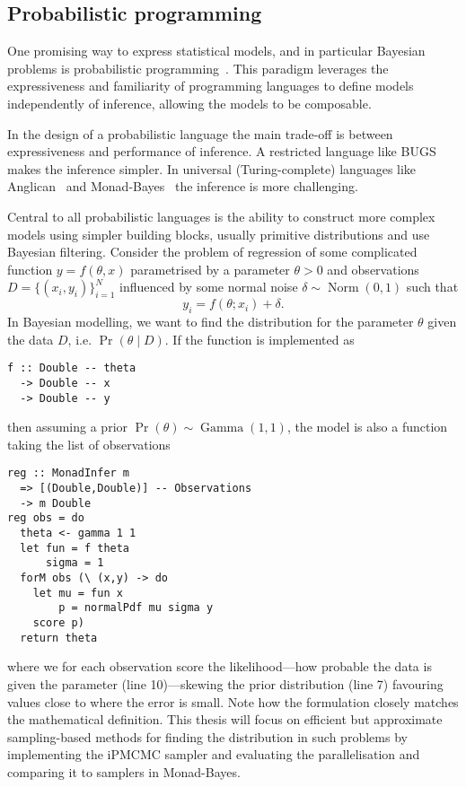 \subsection{Probabilistic programming}
\label{sec:pprog}

One promising way to express statistical models, and in particular Bayesian problems is probabilistic programming~\cite{dippl}. This paradigm leverages the expressiveness and familiarity of programming
languages  to define models independently of inference, allowing the models to be composable.

In the design of a probabilistic language the main trade-off is between
expressiveness and performance of inference. A restricted language like
BUGS~\cite{bugs} makes the inference simpler. In universal
(Turing-complete) languages like Anglican~\cite{anglican} and
Monad-Bayes~\cite{mbayes} the inference is more challenging.

Central to all probabilistic languages is the ability to construct more
complex models using simpler building blocks, usually primitive distributions
and use Bayesian filtering. Consider the problem of regression of some complicated function $y = f(\theta,x)$ parametrised by a parameter $\theta > 0$ and observations $D = \{ (x_i,y_i) \}_{i=1}^N$ influenced by some normal noise $\delta \sim \operatorname{Norm}(0,1)$ such that
\begin{equation}
   y_i = f(\theta;x_i) + \delta .
\end{equation}
In Bayesian modelling, we want to find the distribution for the parameter $\theta$ given the data $D$, i.e. $\Pr(\theta \mid D)$. If the function is implemented as
\begin{verbatim}
f :: Double -- theta
  -> Double -- x
  -> Double -- y
\end{verbatim}
then assuming a prior $\Pr(\theta) \sim \operatorname{Gamma}(1,1)$, the model is also a function taking the list of observations
\begin{verbatim}
reg :: MonadInfer m
  => [(Double,Double)] -- Observations
  -> m Double
reg obs = do
  theta <- gamma 1 1
  let fun = f theta
      sigma = 1
  forM obs (\ (x,y) -> do
    let mu = fun x
        p = normalPdf mu sigma y
    score p)
  return theta
\end{verbatim}
where we for each observation score the likelihood---how probable the data is given the parameter (line 10)---skewing the prior distribution (line 7) favouring values close to where the error is small. Note how the formulation closely matches the mathematical definition. This thesis will focus on efficient but approximate sampling-based
methods for finding the distribution in such problems by implementing the iPMCMC sampler and evaluating the parallelisation and comparing it to samplers in Monad-Bayes.


